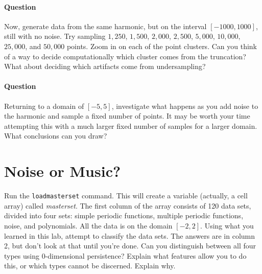\documentclass[12pt,twoside]{article}
\newcommand{\qn}{\paragraph*{Question}}
\begin{document}
\pagebreak

\qn Now, generate data from the same harmonic, but on the interval $[-1000,1000]$, still with no noise.  Try sampling $1,250$, $1,500$, $2,000$, $2,500$, $5,000$, $10,000$, $25,000$, and $50,000$ points.  Zoom in on each of the point clusters.  Can you think of a way to decide computationally which cluster comes from the truncation?  What about deciding which artifacts come from undersampling?\vfill


\pagebreak

\qn Returning to a domain of $[-5,5]$, investigate what happens as you add noise to the harmonic and sample a fixed number of points.  It may be worth your time attempting this with a much larger fixed number of samples for a larger domain.  What conclusions can you draw?\vfill

\pagebreak


\section{Noise or Music?}

Run the \verb|loadmasterset| command.  This will create a variable (actually, a cell array) called \emph{masterset}.  The first column of the array consists of 120 data sets, divided into four sets: simple periodic functions, multiple periodic functions, noise, and polynomials.  All the data is on the domain $[-2,2]$.  Using what you learned in this lab, attempt to classify the data sets.  The answers are in column 2, but don't look at that until you're done.  Can you distinguish between all four types using $0$-dimensional persistence?  Explain what features allow you to do this, or which types cannot be discerned.  Explain why.\vfill


\label{LastPage}
\end{document}
